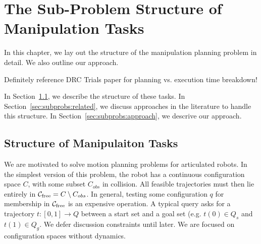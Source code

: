 \chapter{The Sub-Problem Structure of Manipulation Tasks}
\label{chap:formulation}

In this chapter,
we lay out the structure of the manipulation planning problem
in detail.
We also outline our approach.

Definitely reference DRC Trials paper for planning vs. execution
time breakdown!

In Section~\ref{sec:subprobs:structure},
we describe the structure of these tasks.
In Section~\ref{sec:subprobs:related},
we discuss approaches in the literature
to handle this structure.
In Section~\ref{sec:subprobs:approach},
we descrive our approach.

\section{Structure of Manipulaiton Tasks}
\label{sec:subprobs:structure}

We are motivated to solve motion planning problems for articulated robots.
In the simplest version of this problem,
the robot has a continuous configuration space $C$,
with some subset $C_{obs}$ in collision.
All feasible trajectories must then lie entirely in
$\mathcal{C}_{\mbox{\scriptsize free}} = C \setminus C_{obs}$.
In general, testing some configuration $q$ for membership in
$\mathcal{C}_{\mbox{\scriptsize free}}$
is an expensive operation.
A typical query asks for a trajectory $t: [0,1] \rightarrow Q$ between
a start set and a goal set (e.g. $t(0) \in Q_s$ and $t(1) \in Q_g$.
We defer discussion constraints until later.
We are focused on configuration spaces without dynamics.


